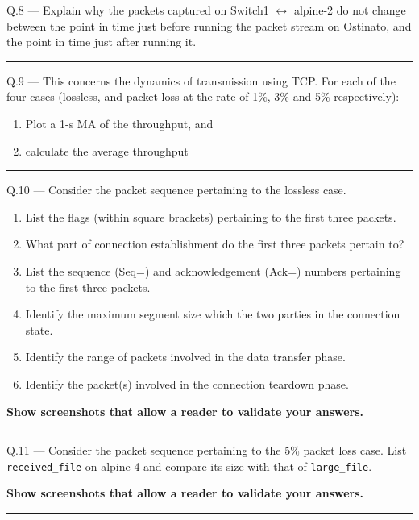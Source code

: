 \documentclass{article}
\newcommand\Que[2]{%
   \begin{samepage}
   \leavevmode\par
   \noindent
   Q.#1 --- #2\par\vspace{10pt}\hrule\vspace{10pt}
   \end{samepage}}
\begin{document}
\Que{8}{Explain why the packets captured on Switch1
   $\leftrightarrow$ alpine-2 do not change between the point in
   time just before running the packet stream on Ostinato, and
   the point in time just after
running it.}

\Que{9}{
This concerns the dynamics of transmission using TCP. For each
of the four cases (lossless, and packet loss at the rate of 1\%,
3\% and 5\% respectively):
\begin{enumerate}
\item Plot a 1-s MA of the throughput, and
\item calculate the average throughput
\end{enumerate}}

\Que{10}{
Consider the packet sequence pertaining to the lossless case.
\begin{enumerate}
\item List the flags (within square brackets) pertaining to the
   first three packets.
\item What part of connection establishment do the first three
   packets pertain to?
\item List the sequence (Seq=) and acknowledgement (Ack=)
   numbers pertaining to the first three packets.
\item Identify the maximum segment size which the two parties in
   the connection state.
\item Identify the range of packets involved in the data
   transfer phase.
\item Identify the packet(s) involved in the connection teardown
   phase.
\end{enumerate}

\textbf{Show screenshots that allow a reader to validate your answers.}}


\Que{11}{
Consider the packet sequence pertaining to the 5\% packet loss
case. List \texttt{received\_file} on alpine-4 and compare its
size with that of \texttt{large\_file}.

\textbf{Show screenshots that allow a reader to validate your
answers.}}
\end{document}
